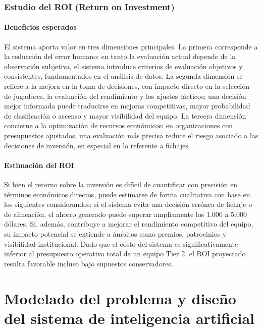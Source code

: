 \documentclass{ULBreport} %
\begin{document}
\subsection{Estudio del ROI (Return on Investment)}

\subsubsection{Beneficios esperados}

El sistema aporta valor en tres dimensiones principales. La primera corresponde a la reducción del error humano: en tanto la evaluación actual depende de la observación subjetiva, el sistema introduce criterios de evaluación objetivos y consistentes, fundamentados en el análisis de datos. La segunda dimensión se refiere a la mejora en la toma de decisiones, con impacto directo en la selección de jugadores, la evaluación del rendimiento y los ajustes tácticos; una decisión mejor informada puede traducirse en mejoras competitivas, mayor probabilidad de clasificación o ascenso y mayor visibilidad del equipo. La tercera dimensión concierne a la optimización de recursos económicos: en organizaciones con presupuestos ajustados, una evaluación más precisa reduce el riesgo asociado a las decisiones de inversión, en especial en lo referente a fichajes.

\subsubsection{Estimación del ROI}

Si bien el retorno sobre la inversión es difícil de cuantificar con precisión en términos económicos directos, puede estimarse de forma cualitativa con base en los siguientes considerandos: si el sistema evita una decisión errónea de fichaje o de alineación, el ahorro generado puede superar ampliamente los 1.000 a 5.000 dólares. Si, además, contribuye a mejorar el rendimiento competitivo del equipo, su impacto potencial se extiende a ámbitos como premios, patrocinios y visibilidad institucional. Dado que el costo del sistema es significativamente inferior al presupuesto operativo total de un equipo Tier 2, el ROI proyectado resulta favorable incluso bajo supuestos conservadores.

\chapter{Modelado del problema y diseño del sistema de inteligencia artificial}
\end{document}
